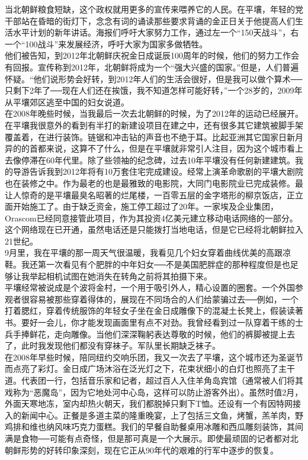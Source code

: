 当北朝鲜粮食短缺，这个政权就用更多的宣传来喂养它的人民。在平壤，年轻的党干部站在昏暗的街灯下，念念有词的诵读那些要求背诵的金正日关于他提高人们生活水平计划的新年讲话。海报们呼吁大家努力工作，通过左一个“150天战斗”，右一个“100战斗”来发展经济，呼吁大家为国家多做牺牲。\\

他们被告知，到2012年北朝鲜庆祝金日成诞辰100周年的时候，他们的努力工作会有回报。宣传称到2012年，北朝鲜将成为一个“强大兴盛的国家。”但是，人们普遍怀疑。“他们说形势会好转，到2012年人们的生活会很好，但是我可以做个算术──只剩下2年了──现在人们还在挨饿，我不知道怎样可能好转，”一个28岁的，2009年从平壤郊区逃至中国的妇女说道。\\

在2008年晚些时候，当我最后一次去北朝鲜的时候，为了2012年的运动已经展开。在平壤我很意外的看到有半打的新建设项目在建之中，还有很多其它建筑被脚手架覆盖着，在进行装饰。链锯和冲击钻的声音也不绝于耳。比起亚洲其它国家日新月异的的首都来说，这算不了什么，但是在平壤就非常引人注目，因为这个城市看上去像停滞在60年代里。除了些领袖的纪念碑，过去10年平壤没有任何新建建筑。我的导游告诉我到2012年将有10万套住宅完成建设。经常上演革命歌剧的平壤大剧院也在装修之中。作为最老的也是最雅致的电影院，大同门电影院业已完成装修。最让人惊奇的是平壤最臭名昭著的烂尾楼，一百零五层的金字塔形的柳京饭店，正立面开始施工了。由于缺乏资金，施工停工超过了20年。一家埃及企业集团，Orascom已经同意接管此项目，作为其投资4亿美元建立移动电话网络的一部分。这个网络现在已开通，虽然电话还是只能拨打当地电话，但是它已经将北朝鲜拉入21世纪。\\

9月里，我在平壤的那一周天气很温暖，我看见几个妇女穿着曲线优美的高跟凉鞋。我还第一次看见有个肥胖的中年妇女──不是美国肥胖症的那种程度但是也足够让我举起相机试图在她消失在转角之前将其拍摄下来。\\

平壤经常被说成是个波将金村，一个用于吸引外人，精心设置的圈套。一个外国参观者很容易被那些穿着得体的，展现在不同场合的人们给蒙骗过去──例如，一个打着腮红，穿着传统服饰的年轻女子坐在金日成雕像下的混凝土长凳上，假装读著书。要好一会儿，你才能发现画面里有点不对劲。我曾经看到过一队穿着干练的士兵手捧鲜花，走向雕像。当他们深深鞠躬表达尊敬的时候，他们的裤脚被提上去了，此时我发现他们都没有穿袜子。军队里长期缺乏袜子。\\

在2008年早些时候，陪同纽约交响乐团，我又一次去了平壤，这个城市还为圣诞节而点亮了彩灯。金日成广场沐浴在泛光灯之下，花束状细小的白灯也照亮了主干道。代表团一行，包括音乐家和记者，超过百人入住羊角岛宾馆（通常被人们将其戏称为“恶魔岛”，因为它地处河中心岛，这样可以防止游客外出）。虽然时值2月，外面天寒地冻，室内却热火朝天，我们都脱掉只剩下T恤。还设有一个有因特网接入的新闻中心。正餐是多道主菜的隆重晚宴，上了包括三文鱼，烤蟹，羔羊肉，野鸡排和维也纳风味巧克力蛋糕。我们的早餐自助餐桌用冰雕和西瓜雕刻装饰，其间满是食物──可能有点奇怪，但是那可真是一个大展示。即使最顽固的记者都对北朝鲜形势的好转印象深刻，现在它正从90年代的艰难的行军中逐步的恢复。\\

